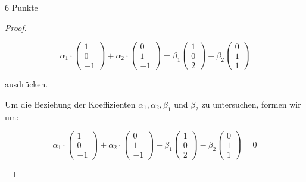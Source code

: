 \documentclass{problemset}
\begin{document}
\begin{problem}{6 Punkte}
\begin{proof}
\begin{enumerate}
              \[
                  \alpha_1 \cdot \begin{pmatrix}
                      1 \\
                      0 \\
                      -1
                  \end{pmatrix} + \alpha_2 \cdot \begin{pmatrix}
                      0 \\
                      1 \\
                      -1
                  \end{pmatrix} = \beta_1 \begin{pmatrix}
                      1 \\ 0 \\ 2
                  \end{pmatrix} + \beta_2 \begin{pmatrix}
                      0 \\ 1 \\ 1
                  \end{pmatrix}
              \]

              ausdrücken.

              Um die Beziehung der Koeffizienten \(\alpha_1, \alpha_2, \beta_1\) und
              \(\beta_2\) zu untersuchen, formen wir um:

              \[
                  \alpha_1 \cdot \begin{pmatrix}
                      1 \\
                      0 \\
                      -1
                  \end{pmatrix} + \alpha_2 \cdot \begin{pmatrix}
                      0 \\
                      1 \\
                      -1
                  \end{pmatrix} - \beta_1 \begin{pmatrix}
                      1 \\ 0 \\ 2
                  \end{pmatrix} - \beta_2 \begin{pmatrix}
                      0 \\ 1 \\ 1
                  \end{pmatrix} = 0
              \]


\end{enumerate}
\end{proof}
\end{problem}
\end{document}
